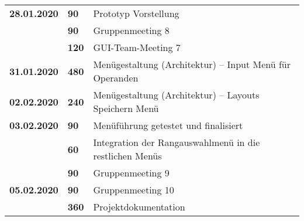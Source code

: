 {\begin{longtable}{|l|l|p{11cm}|}
		\\	
		\hline \textbf{28.01.2020}
		& \textbf{\hfill 90} & Prototyp Vorstellung \\\cline{2-3}
		& \textbf{\hfill 90} & Gruppenmeeting 8 \\
		& \textbf{\hfill 120} & GUI-Team-Meeting 7
		\\	
		\hline \textbf{31.01.2020}
		& \textbf{\hfill 480} & Menügestaltung (Architektur) – Input Menü für Operanden
		\\ \hline \textbf{02.02.2020}
		& \textbf{\hfill 240} & Menügestaltung (Architektur) – Layouts Speichern Menü
		\\	
		\hline \textbf{03.02.2020}
		& \textbf{\hfill 90} & Menüführung getestet und finalisiert \\\cline{2-3}
		& \textbf{\hfill 60} & Integration der Rangauswahlmenü in die restlichen Menüs \\
		& \textbf{\hfill 90} & Gruppenmeeting 9
		\\	
		\hline \textbf{05.02.2020}
		& \textbf{\hfill 90} & Gruppenmeeting 10 \\\cline{2-3}
		& \textbf{\hfill 360} & Projektdokumentation
		\\ \hline\hline
	\end{longtable}
}

\clearpage

